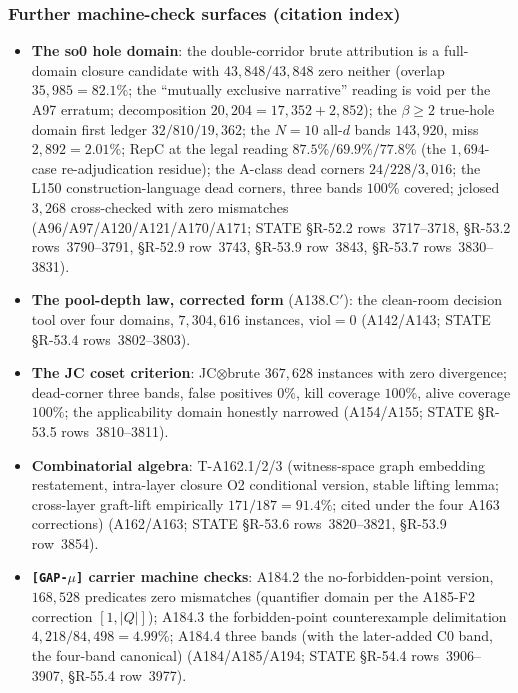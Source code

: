\subsubsection{Further machine-check surfaces (citation index)
\tierMCA}\label{subsubsec:add-others}

\begin{itemize}
\item \textbf{The so0 hole domain}: the double-corridor brute attribution is
a full-domain closure candidate with $43{,}848/43{,}848$ zero neither
(overlap $35{,}985=82.1\%$; the ``mutually exclusive narrative'' reading is
void per the A97 erratum; decomposition $20{,}204=17{,}352+2{,}852$); the
$\beta\ge2$ true-hole domain first ledger $32/810/19{,}362$; the $N=10$
all-$d$ bands $143{,}920$, miss $2{,}892=2.01\%$; RepC at the legal reading
$87.5\%/69.9\%/77.8\%$ (the $1{,}694$-case re-adjudication residue); the
A-class dead corners $24/228/3{,}016$; the L150 construction-language dead
corners, three bands $100\%$ covered; jclosed $3{,}268$ cross-checked with
zero mismatches (A96/A97/A120/A121/A170/A171; STATE \S R-52.2
rows~3717--3718, \S R-53.2 rows~3790--3791, \S R-52.9 row~3743, \S R-53.9
row~3843, \S R-53.7 rows~3830--3831).
\item \textbf{The pool-depth law, corrected form} (A138.C$'$): the
clean-room decision tool over four domains, $7{,}304{,}616$ instances,
viol$=0$ (A142/A143; STATE \S R-53.4 rows~3802--3803).
\item \textbf{The JC coset criterion}: JC$\otimes$brute $367{,}628$
instances with zero divergence; dead-corner three bands, false positives
$0\%$, kill coverage $100\%$, alive coverage $100\%$; the applicability
domain honestly narrowed (A154/A155; STATE \S R-53.5 rows~3810--3811).
\item \textbf{Combinatorial algebra}: T-A162.1/2/3 (witness-space graph
embedding restatement, intra-layer closure O2 conditional version, stable
lifting lemma; cross-layer graft-lift empirically $171/187=91.4\%$; cited
under the four A163 corrections) (A162/A163; STATE \S R-53.6
rows~3820--3821, \S R-53.9 row~3854).
\item \textbf{\texttt{[GAP-$\mu$]} carrier machine checks}: A184.2 the
no-forbidden-point version, $168{,}528$ predicates zero mismatches
(quantifier domain per the A185-F2 correction $[1,|Q|]$); A184.3 the
forbidden-point counterexample delimitation $4{,}218/84{,}498=4.99\%$;
A184.4 three bands (with the later-added C0 band, the four-band canonical)
(A184/A185/A194; STATE \S R-54.4 rows~3906--3907, \S R-55.4 row~3977).

\end{itemize}
